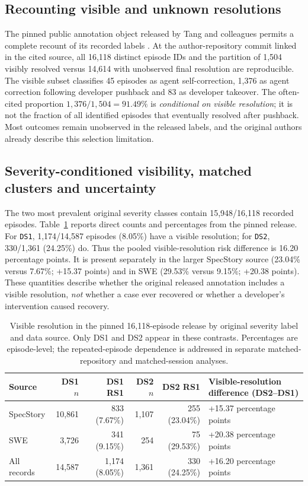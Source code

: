 \subsection{Recounting visible and unknown resolutions}
The pinned public annotation object released by Tang and colleagues permits a complete recount of its recorded labels \cite{ref35}. At the author-repository commit linked in the cited source, all 16,118 distinct episode IDs and the partition of 1,504 visibly resolved versus 14,614 with unobserved final resolution are reproducible. The visible subset classifies 45 episodes as agent self-correction, 1,376 as agent correction following developer pushback and 83 as developer takeover. The often-cited proportion \(1,376/1,504=91.49\%\) is \emph{conditional on visible resolution}; it is not the fraction of all identified episodes that eventually resolved after pushback. Most outcomes remain unobserved in the released labels, and the original authors already describe this selection limitation.

\subsection{Severity-conditioned visibility, matched clusters and uncertainty}\label{sec:newresult}
The two most prevalent original severity classes contain 15,948/16,118 recorded episodes. Table~\ref{tab:severity} reports direct counts and percentages from the pinned release. For \texttt{DS1}, 1,174/14,587 episodes (8.05\%) have a visible resolution; for \texttt{DS2}, 330/1,361 (24.25\%) do. Thus the pooled visible-resolution risk difference is 16.20 percentage points. It is present separately in the larger SpecStory source (23.04\% versus 7.67\%; +15.37 points) and in SWE (29.53\% versus 9.15\%; +20.38 points). These quantities describe whether the original released annotation includes a visible resolution, \emph{not} whether a case ever recovered or whether a developer's intervention caused recovery.

\begin{table}[htbp]
\centering\small
\caption{Visible resolution in the pinned 16,118-episode release by original severity label and data source. Only DS1 and DS2 appear in these contrasts. Percentages are episode-level; the repeated-episode dependence is addressed in separate matched-repository and matched-session analyses.}
\label{tab:severity}
\begin{tabularx}{\textwidth}{@{}lrrrrX@{}}
\toprule
Source & DS1 $n$ & DS1 RS1 & DS2 $n$ & DS2 RS1 & Visible-resolution difference (DS2--DS1) \\
\midrule
SpecStory & 10,861 & 833 (7.67\%) & 1,107 & 255 (23.04\%) & +15.37 percentage points \\
SWE & 3,726 & 341 (9.15\%) & 254 & 75 (29.53\%) & +20.38 percentage points \\
All records & 14,587 & 1,174 (8.05\%) & 1,361 & 330 (24.25\%) & +16.20 percentage points \\
\bottomrule
\end{tabularx}
\end{table}

